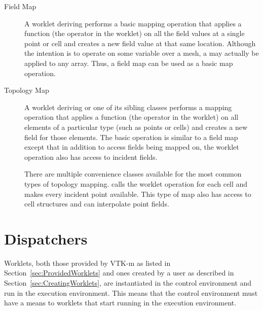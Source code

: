 \begin{description}
\item[Field Map]  
  A worklet deriving  performs a basic mapping
  operation that applies a function (the operator in the worklet) on all
  the field values at a single point or cell and creates a new field value
  at that same location. Although the intention is to operate on some
  variable over a mesh, a  may actually be
  applied to any array. Thus, a field map can be used as a basic
  map operation.

\item[Topology Map] 
   A worklet deriving
   or one of its sibling classes performs a
  mapping operation that applies a function (the operator in the worklet)
  on all elements of a particular type (such as points or cells) and
  creates a new field for those elements. The basic operation is similar to
  a field map except that in addition to access fields being mapped on, the
  worklet operation also has access to incident fields.

  There are multiple convenience classes available for the most common
  types of topology mapping. 
    calls
  the worklet operation for each cell and makes every incident point
  available. This type of map also has access to cell structures and can
  interpolate point fields.
\end{description}



\section{Dispatchers}
\label{sec:Dispatchers}


Worklets, both those provided by VTK-m as listed in
Section~\ref{sec:ProvidedWorklets} and ones created by a user as described
in Section~\ref{sec:CreatingWorklets}, are instantiated in the control
environment and run in the execution environment. This means that the
control environment must have a means to 
worklets that start running in the execution environment.

